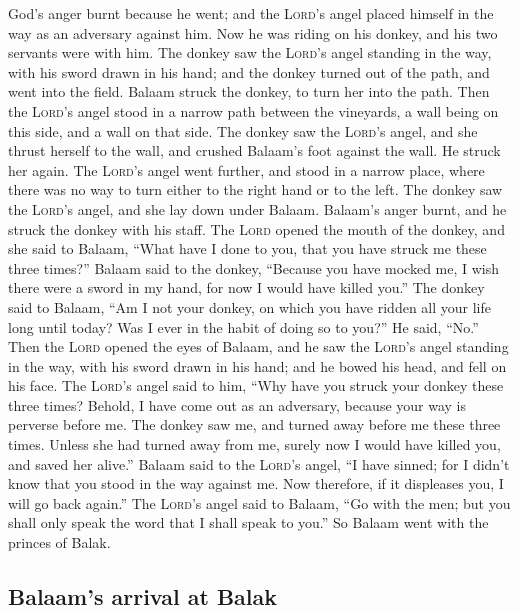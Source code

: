  God's anger burnt because he went; and the
\textsc{Lord}'s angel placed himself in the way as an adversary against
him. Now he was riding on his donkey, and his two servants were with
him.  The donkey saw the \textsc{Lord}'s angel standing
in the way, with his sword drawn in his hand; and the donkey turned out
of the path, and went into the field. Balaam struck the donkey, to turn
her into the path.  Then the \textsc{Lord}'s angel stood
in a narrow path between the vineyards, a wall being on this side, and a
wall on that side.  The donkey saw the \textsc{Lord}'s
angel, and she thrust herself to the wall, and crushed Balaam's foot
against the wall. He struck her again.  The
\textsc{Lord}'s angel went further, and stood in a narrow place, where
there was no way to turn either to the right hand or to the left.
 The donkey saw the \textsc{Lord}'s angel, and she lay
down under Balaam. Balaam's anger burnt, and he struck the donkey with
his staff.  The \textsc{Lord} opened the mouth of the
donkey, and she said to Balaam, ``What have I done to you, that you have
struck me these three times?''  Balaam said to the
donkey, ``Because you have mocked me, I wish there were a sword in my
hand, for now I would have killed you.''  The donkey said
to Balaam, ``Am I not your donkey, on which you have ridden all your
life long until today? Was I ever in the habit of doing so to you?'' He
said, ``No.''  Then the \textsc{Lord} opened the eyes of
Balaam, and he saw the \textsc{Lord}'s angel standing in the way, with
his sword drawn in his hand; and he bowed his head, and fell on his
face.  The \textsc{Lord}'s angel said to him, ``Why have
you struck your donkey these three times? Behold, I have come out as an
adversary, because your way is perverse before me.  The
donkey saw me, and turned away before me these three times. Unless she
had turned away from me, surely now I would have killed you, and saved
her alive.''  Balaam said to the \textsc{Lord}'s angel,
``I have sinned; for I didn't know that you stood in the way against me.
Now therefore, if it displeases you, I will go back again.''
 The \textsc{Lord}'s angel said to Balaam, ``Go with the
men; but you shall only speak the word that I shall speak to you.'' So
Balaam went with the princes of Balak.

\hypertarget{balaams-arrival-at-balak}{%
\subsection{Balaam's arrival at Balak}\label{balaams-arrival-at-balak}}

